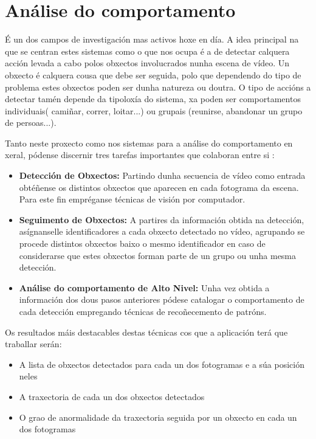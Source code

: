 \section{Análise do comportamento}
	É un dos campos de investigación mas activos hoxe en día. A idea principal na que se 
	centran estes sistemas como o que nos ocupa é a de detectar calquera acción levada a 
	cabo polos obxectos involucrados nunha escena de vídeo. Un obxecto é calquera cousa 
	que debe ser seguida, polo que dependendo do tipo de problema estes obxectos poden 
	ser dunha natureza ou doutra.
	O tipo de accións a detectar tamén depende da tipoloxía do sistema, xa poden ser
	comportamentos individuais( camiñar, correr, loitar...) ou grupais (reunirse, abandonar
	un grupo de persoas...).
	
	Tanto neste proxecto como nos sistemas para a análise do comportamento en xeral, 
	pódense discernir tres tarefas importantes que colaboran entre si \cite{brais-thesis}:
	
	\begin{itemize}
	
		\item{\textbf{Detección de Obxectos:}}\label{cap:DeteccionObxetos} Partindo dunha secuencia de vídeo como 
		entrada obtéñense os distintos obxectos que aparecen en cada fotograma da escena.
		Para este fin empréganse técnicas de visión por computador.
		
		
		\item{\textbf{Seguimento de Obxectos:}} A partires da información obtida na detección, asígnanselle 
		identificadores a cada obxecto detectado no vídeo, agrupando se procede distintos
		obxectos baixo o mesmo identificador en caso de considerarse que estes obxectos forman
		parte de un grupo ou unha mesma detección.
		
		
		\item{\textbf{Análise do comportamento de Alto Nivel:}} Unha vez obtida a información dos 
		dous pasos anteriores pódese catalogar o comportamento de cada detección empregando
		técnicas de recoñecemento de patróns.
	
	\end{itemize}	
	
	Os resultados máis destacables destas técnicas cos que a aplicación terá que traballar serán:
	\begin{itemize}
		\item A lista de obxectos detectados para cada un dos fotogramas e a súa posición neles
		\item A traxectoria de cada un dos obxectos detectados
		\item O grao de anormalidade da traxectoria seguida por un obxecto en cada un dos fotogramas
	\end{itemize}
	
